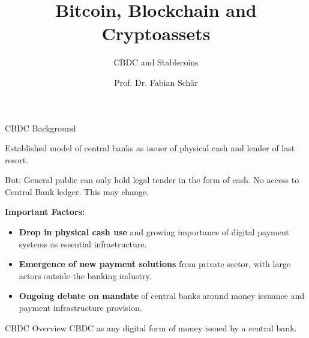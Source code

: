 \documentclass[handout]{beamer}
\title{Bitcoin, Blockchain and Cryptoassets}
\subtitle{CBDC and Stablecoins}
\author{Prof. Dr. Fabian Schär}
\institute{University of Basel}
\begin{document}
\thispagestyle{empty}
\begin{frame}[noframenumbering]
	\titlepage
\end{frame}


\begin{frame}{CBDC Background}

Established model of central banks as issuer of physical cash and lender of last resort.\\ \vspace{1em}

 But: General public can only hold legal tender in the form of cash. No access to Central Bank ledger. This may change.
\vspace{1.5em}	

\textbf{Important Factors:}
\begin{itemize}
	\item \textbf{Drop in physical cash use} and growing importance of digital payment systems as essential infrastructure.
	\item \textbf{Emergence of new payment solutions} from private sector, with large actors outside the banking industry.
	\item \textbf{Ongoing debate on mandate} of central banks around money issuance and payment infrastructure provision.
\end{itemize}

\end{frame}


\begin{frame}{CBDC Overview}
CBDC as any \color{focus} digital form of money issued by a central bank. \color{black} 

\begin{center}
	\begin{tikzpicture}[scale=0.4, every node/.style ={scale=0.8}]
		
	\end{tikzpicture}
\end{center}



\end{frame}
\end{document}
